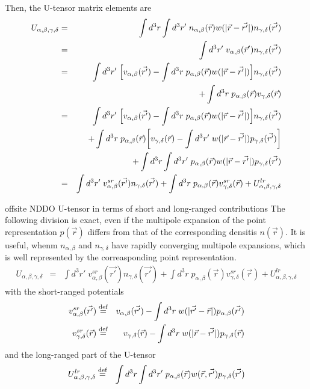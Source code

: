 \documentclass[11pt,a4paper]{report}
\begin{document}
Then, the U-tensor matrix elements are
\begin{eqnarray}
U_{\alpha,\beta,\gamma,\delta}
&=&\int d^3r\int d^3r'\;
n_{\alpha,\beta}(\vec{r})w(|\vec{r}-\vec{r'}|)n_{\gamma,\delta}(\vec{r'})
\nonumber\\
&=&\int d^3r'\;v_{\alpha,\beta}(\vec{r}')n_{\gamma,\delta}(\vec{r'})
\nonumber\\
&=&\int d^3r'\;\Bigl[v_{\alpha,\beta}(\vec{r'})
-\int d^3r\;p_{\alpha,\beta}(\vec{r})w(|\vec{r}-\vec{r'}|)\Bigr]
n_{\gamma,\delta}(\vec{r'})
\nonumber\\
&&+\int d^3r\; p_{\alpha,\beta}(\vec{r}) v_{\gamma,\delta}(\vec{r})
\nonumber\\
&=&\int d^3r'\;\Bigl[v_{\alpha,\beta}(\vec{r'})
-\int d^3r\;p_{\alpha,\beta}(\vec{r})w(|\vec{r}-\vec{r'}|)\Bigr]
n_{\gamma,\delta}(\vec{r'})
\nonumber\\
&&+\int d^3r\; p_{\alpha,\beta}(\vec{r}) 
\biggl[v_{\gamma,\delta}(\vec{r})-\int d^3r'\;w(|\vec{r}-\vec{r'}|)
p_{\gamma,\delta}(\vec{r'})\biggr]
\nonumber\\
&&+\int d^3r\int d^3r'\; 
p_{\alpha,\beta}(\vec{r}) w(|\vec{r}-\vec{r'}|)p_{\gamma,\delta}(\vec{r'})
\nonumber\\
%
%
%
&=&\int d^3r'\;v^{sr}_{\alpha,\beta}(\vec{r'})n_{\gamma,\delta}(\vec{r'})
+\int d^3r\; p_{\alpha,\beta}(\vec{r}) v^{sr}_{\gamma,\delta}(\vec{r})
+U^{lr}_{\alpha,\beta,\gamma,\delta}
\end{eqnarray}

\begin{myshadowminipage}{offsite NDDO U-tensor in terms of 
short and long-ranged contributions} The following division is exact,
  even if the multipole expansion of the point representation
  $p(\vec{r})$ differs from that of the corresponding densitis
  $n(\vec{r})$. It is useful, whenm $n_{\alpha,\beta}$ and
  $n_{\gamma,\delta}$ have rapidly converging multipole expansions,
  which is well represented by the correasponding point
  representation.
\begin{eqnarray}
U_{\alpha,\beta,\gamma,\delta} &=&\int
d^3r'\;v^{sr}_{\alpha,\beta}(\vec{r'})n_{\gamma,\delta}(\vec{r'})
+\int d^3r\; p_{\alpha,\beta}(\vec{r}) v^{sr}_{\gamma,\delta}(\vec{r})
+U^{lr}_{\alpha,\beta,\gamma,\delta}
\label{eq:udivision}
\end{eqnarray}
with the short-ranged potentials
\begin{eqnarray}
v^{sr}_{\alpha,\beta}(\vec{r'})&\stackrel{\text{def}}{=}&
v_{\alpha,\beta}(\vec{r'})
-\int d^3r\; w(|\vec{r'}-\vec{r}|)p_{\alpha,\beta}(\vec{r'})
\label{eq:v12sr}
\nonumber\\
v^{sr}_{\gamma,\delta}(\vec{r})&\stackrel{\text{def}}{=}&
v_{\gamma,\delta}(\vec{r})
-\int d^3r\; w(|\vec{r}-\vec{r'}|)p_{\gamma,\delta}(\vec{r})
\label{eq:v34sr}
\end{eqnarray}
and the long-ranged part of the U-tensor
\begin{eqnarray}
U^{lr}_{\alpha,\beta,\gamma,\delta}
&\stackrel{\text{def}}{=}&
\int d^3r\int d^3r'\; 
p_{\alpha,\beta}(\vec{r}) w(\vec{r},\vec{r'})p_{\gamma,\delta}(\vec{r'})
\label{eq:ulr}
\end{eqnarray}
\end{myshadowminipage}
\end{document}
